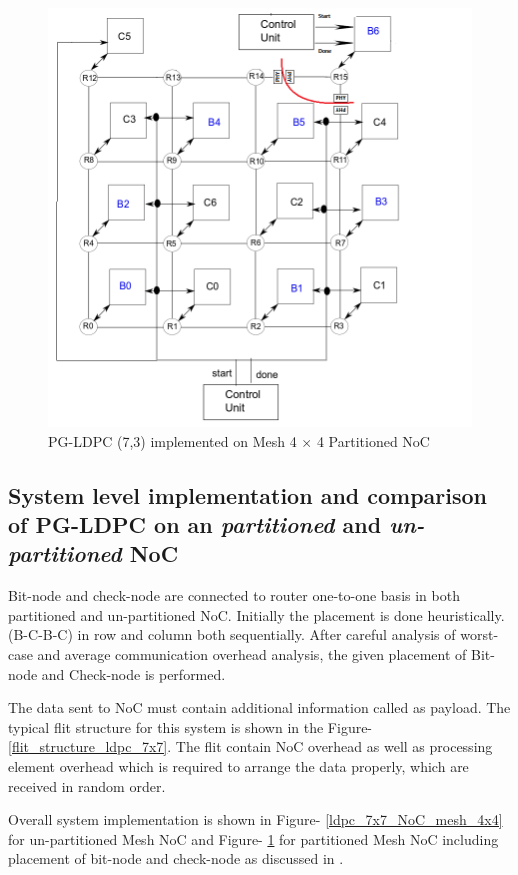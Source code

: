  \begin{figure} [H]
  \centering
   \includegraphics[scale=0.4]{./figs/Partitioned4x4Mesh}
  \caption{PG-LDPC (7,3) implemented on Mesh 4 $\times$ 4 Partitioned NoC}
  \label{Partitioned4x4Mesh}
\end{figure}

 \subsection{System level implementation and comparison of PG-LDPC on an \textit{partitioned} and \textit{un-partitioned} NoC}
 Bit-node and check-node are connected to router one-to-one basis in both partitioned and un-partitioned NoC. 
 Initially the placement is done heuristically. 
 (B-C-B-C) in row and column both sequentially. 
 After careful analysis of worst-case and average communication overhead 
 analysis, the given placement of Bit-node and Check-node is performed. 

 The data sent to NoC must contain additional information called as payload.
 The typical flit structure for this system is shown in the Figure-\ref{flit_structure_ldpc_7x7}.
 The flit contain NoC overhead as well as processing element overhead which is required to arrange 
 the data properly, which are received in random order.
 
Overall system implementation is shown in Figure- \ref{ldpc_7x7_NoC_mesh_4x4} for un-partitioned Mesh NoC and Figure- \ref{Partitioned4x4Mesh} for partitioned Mesh NoC including placement of bit-node and check-node as discussed in \cite{shaishav_mtp}.

